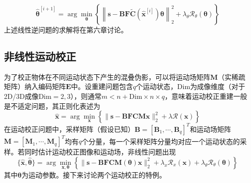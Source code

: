 \documentclass[12pt]{article}
\begin{document}
\begin{equation}
    \hat{\bm{\theta}}^{[i+1]}=\arg\min_{\bm{\theta}}\left\{\left\|\bm{s}-\mathbf{B}\mathbf{F}\tilde{\mathbf{C}}(\hat{\bm{x}}^{[i]})\bm{\theta}\right\|_2^2+\lambda_\theta\mathcal{R}_\theta(\bm{\theta})\right\}
    \label{equ:2.45}
\end{equation}
上述线性逆问题的求解将在第六章讨论。

\subsection{非线性运动校正}
为了校正物体在不同运动状态下产生的混叠伪影，可以将运动场矩阵$\mathbf{M}$（实稀疏矩阵）纳入编码矩阵$\mathbf{E}$中。设重建问题包含$q$个运动状态，$\mathrm{Dim}$为成像维度（对于2D/3D成像$\mathrm{Dim}=2,3$），则通常$m<n+\mathrm{Dim}\times n\times q$，意味着运动校正重建一般是不适定问题，其正则化表述为
\begin{equation}
    \hat{\bm{x}}=\arg\min_{\bm{x}}\left\{\|\bm{s}-\mathbf{B}\mathbf{F}\mathbf{C}\mathbf{M}\bm{x}\|_2^2+\lambda\mathcal{R}(\bm{x})\right\}
    \label{equ:2.46}
\end{equation}
在运动校正问题中，采样矩阵（假设已知）$\mathbf{B}=[\mathbf{B}_1,\cdots,\mathbf{B}_q]^T$和运动场矩阵$\mathbf{M}=[\mathbf{M}_1,\cdots,\mathbf{M}_q]^T$均有$q$个分量，每一个采样矩阵分量均对应一个运动状态的采样。若同时估计运动校正图像和运动场，非线性问题出现
\begin{equation}
    \{\hat{\bm{x}},\hat{\bm{\theta}}\}=\arg\min_{\bm{x},\bm{\theta}}\left\{\|\bm{s}-\mathbf{B}\mathbf{F}\mathbf{C}\mathbf{M}(\bm{\theta})\bm{x}\|_2^2+\lambda_x\mathcal{R}_x(\bm{x})+\lambda_\theta\mathcal{R}_\theta(\bm{\theta})\right\}
    \label{equ:2.47}
\end{equation}
其中$\bm{\theta}$为运动参数。接下来讨论两个运动校正的特例。
\end{document}

